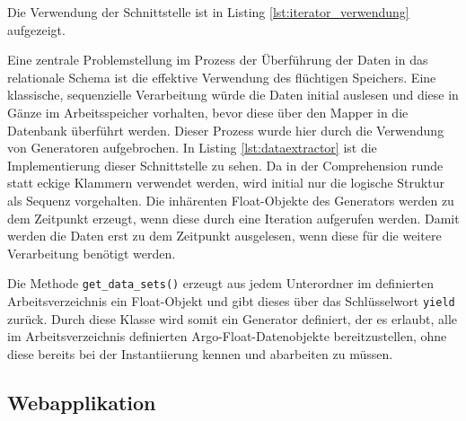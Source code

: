 
Die Verwendung der Schnittstelle ist in Listing \ref{lst:iterator_verwendung} aufgezeigt.




Eine zentrale Problemstellung im Prozess der Überführung der Daten in das relationale Schema ist die effektive Verwendung des flüchtigen Speichers. Eine klassische, sequenzielle Verarbeitung würde die Daten initial auslesen und diese in Gänze im Arbeitsspeicher vorhalten, bevor diese über den Mapper in die Datenbank überführt werden. Dieser Prozess wurde hier durch die Verwendung von Generatoren aufgebrochen. In Listing \ref{lst:dataextractor} ist die Implementierung dieser Schnittstelle zu sehen. Da in der Comprehension runde statt eckige Klammern verwendet werden, wird initial nur die logische Struktur als Sequenz vorgehalten. Die inhärenten Float-Objekte des Generators werden zu dem Zeitpunkt erzeugt, wenn diese durch eine Iteration aufgerufen werden. Damit werden die Daten erst zu dem Zeitpunkt ausgelesen, wenn diese für die weitere Verarbeitung benötigt werden.



Die Methode \texttt{get\_data\_sets()} erzeugt aus jedem Unterordner im definierten Arbeitsverzeichnis ein Float-Objekt und gibt dieses über das Schlüsselwort \texttt{yield} zurück. Durch diese Klasse wird somit ein Generator definiert, der es erlaubt, alle im Arbeitsverzeichnis definierten Argo-Float-Datenobjekte bereitzustellen, ohne diese bereits bei der Instantiierung kennen und abarbeiten zu müssen.







\pagebreak
\subsection{Webapplikation}


